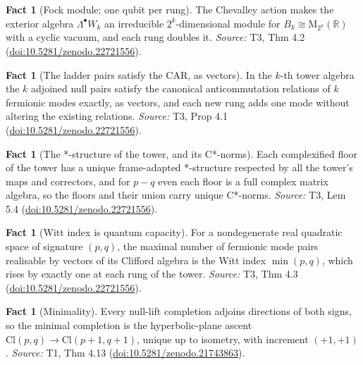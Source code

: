 \documentclass[11pt]{article}
\theoremstyle{definition}
\newtheorem{fact}[theorem]{Fact}
\theoremstyle{plain}
\providecommand{\Cl}{}\renewcommand{\Cl}{\mathrm{Cl}}
\providecommand{\Mat}{}\renewcommand{\Mat}{\mathrm{M}}
\providecommand{\R}{}\renewcommand{\R}{\mathbb{R}}
\begin{document}
\begin{fact}[Fock module; one qubit per rung]\label{c:tower.fock-module-one-qubit-per-rung}
The Chevalley action makes the exterior algebra $\Lambda^\bullet W_k$ an irreducible $2^k$-dimensional module for $B_k \cong \Mat_{2^k}(\R)$ with a cyclic vacuum, and each rung doubles it.
\emph{Source:} T3, Thm 4.2 (\href{https://doi.org/10.5281/zenodo.22721556}{doi:10.5281/zenodo.22721556}).
\end{fact}

\begin{fact}[The ladder pairs satisfy the CAR, as vectors]\label{c:tower.ladder-pairs-satisfy-car-vectors}
In the $k$-th tower algebra the $k$ adjoined null pairs satisfy the canonical anticommutation relations of $k$ fermionic modes exactly, as vectors, and each new rung adds one mode without altering the existing relations.
\emph{Source:} T3, Prop 4.1 (\href{https://doi.org/10.5281/zenodo.22721556}{doi:10.5281/zenodo.22721556}).
\end{fact}

\begin{fact}[The *-structure of the tower, and its C*-norms]\label{c:tower.structure-tower-c-norms}
Each complexified floor of the tower has a unique frame-adapted *-structure respected by all the tower's maps and correctors, and for $p - q$ even each floor is a full complex matrix algebra, so the floors and their union carry unique C*-norms.
\emph{Source:} T3, Lem 5.4 (\href{https://doi.org/10.5281/zenodo.22721556}{doi:10.5281/zenodo.22721556}).
\end{fact}

\begin{fact}[Witt index is quantum capacity]\label{c:tower.witt-index-quantum-capacity}
For a nondegenerate real quadratic space of signature $(p,q)$, the maximal number of fermionic mode pairs realisable by vectors of its Clifford algebra is the Witt index $\min(p,q)$, which rises by exactly one at each rung of the tower.
\emph{Source:} T3, Thm 4.3 (\href{https://doi.org/10.5281/zenodo.22721556}{doi:10.5281/zenodo.22721556}).
\end{fact}

\begin{fact}[Minimality]\label{c:transport.minimality}
Every null-lift completion adjoins directions of both signs, so the minimal completion is the hyperbolic-plane ascent $\Cl(p,q) \to \Cl(p{+}1,q{+}1)$, unique up to isometry, with increment $(+1,+1)$.
\emph{Source:} T1, Thm 4.13 (\href{https://doi.org/10.5281/zenodo.21743863}{doi:10.5281/zenodo.21743863}).
\end{fact}
\end{document}
